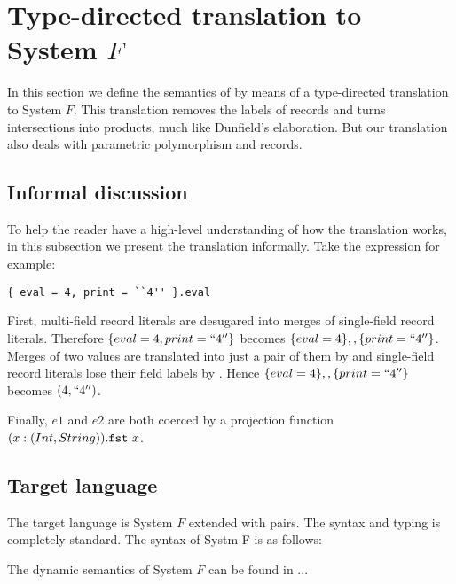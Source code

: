 \section{Type-directed translation to System $ F $}

In this section we define the semantics of \name by means of a type-directed
translation to System $ F $. This translation removes the labels of records and
turns intersections into products, much like Dunfield's elaboration. But our
translation also deals with parametric polymorphism and records.

\subsection{Informal discussion}

To help the reader have a high-level understanding of how the translation
works, in this subsection we present the translation informally. Take the \name
expression for example:

\begin{lstlisting}
{ eval = 4, print = ``4'' }.eval
\end{lstlisting}

First, multi-field record literals are desugared into merges of single-field
record literals. Therefore $ \{ eval = 4, print = ``4'' \} $ becomes
$ \{ eval = 4 \} ,, \{ print = ``4'' \} $. Merges of two values are translated
into just a pair of them by  and single-field record literals lose their field
labels by . Hence $ \{ eval = 4 \} ,, \{ print = ``4'' \} $
becomes $ (4, ``4'') $.

Finally, $ e1 $ and $ e2 $ are both coerced by a projection function
$ \\(x:(Int,String)). \texttt{fst} ~ x $.

\subsection{Target language}

The target language is System $ F $ extended with pairs. The syntax and typing is
completely standard. The syntax of Systm F is as follows:



The dynamic semantics of System $ F $ can be found in ...

